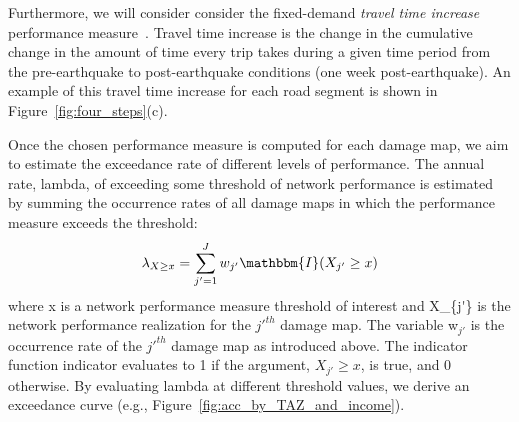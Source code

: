 Furthermore, we will consider consider the fixed-demand \emph{travel time increase} performance measure~\cite[e.g.,][]{jayaram_efficient_2010,han_probabilistic_2012}. Travel time increase is the change in the cumulative change in the amount of time every trip takes during a given time period from the pre-earthquake to post-earthquake conditions (one week post-earthquake). An example of this travel time increase for each road segment is shown in Figure~\ref{fig:four_steps}{(c)}.


Once the chosen performance measure is computed for each damage map, we aim to estimate the exceedance rate of different levels of performance. The annual rate, \gls{lambda}, of exceeding some threshold of network performance is estimated by summing the occurrence rates of all damage maps in which the performance measure exceeds the threshold: 
\begin{equation}
\lambda_{X \geq x} = \sum_{j'=1}^{J} w_{j'} \mathbbm{I}(X_{j'}\geq x)
\label{eq:exceedance}
\end{equation}
where \gls{x} is a network performance measure threshold of interest and \gls{X_{j'}} is the network performance realization for the $j'^{th}$ damage map. The variable \gls{w}$_{j'}$ is the occurrence rate of the $j'^{th}$ damage map as introduced above.%
The indicator function \gls{indicator}  evaluates to 1 if the argument, $X_{j'} \geq x$, is true, and 0 otherwise.
By evaluating \gls{lambda} at different threshold values, we derive an exceedance curve (e.g., Figure~\ref{fig:acc_by_TAZ_and_income}). 

